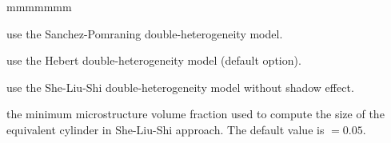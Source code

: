 \begin{ListeDeDescription}{mmmmmmm}
\item[\moc{SAPO}] use the Sanchez-Pomraning double-heterogeneity model.\cite{sapo}

\item[\moc{HEBE}] use the Hebert double-heterogeneity model (default option).\cite{BIHET}

\item[\moc{SLSI}] use the She-Liu-Shi double-heterogeneity model without shadow effect.\cite{She2017}

\item[\dusa{frtm}] the minimum microstructure volume fraction used to compute the size of the equivalent cylinder in She-Liu-Shi approach. The default value is  $=0.05$.

\end{ListeDeDescription}

\eject
